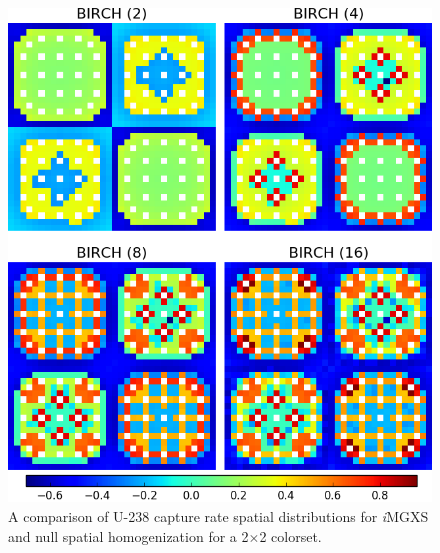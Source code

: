 \begin{figure}[h!]
\centering
\includegraphics[width=0.9\linewidth]{figures/results/compare/2x2/compare-capt}
\vspace{2mm}
\caption[U-238 capture rate comparison for a 2$\times$2 colorset]{A comparison of U-238 capture rate spatial distributions for \textit{i}\ac{MGXS} and null spatial homogenization for a 2$\times$2 colorset.}
\label{fig:chap11-assm-2x2-capt-rates-comp}
\end{figure}

\clearpage

